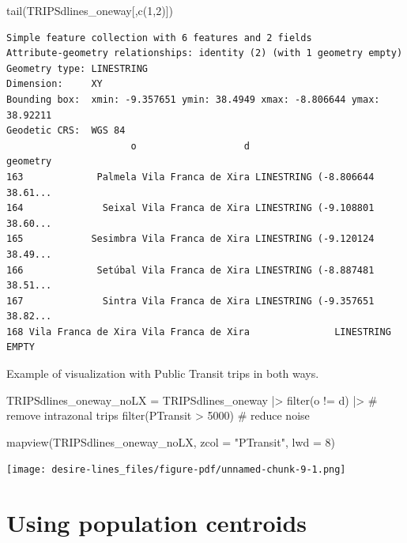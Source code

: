 \documentclass[
  letterpaper,
  DIV=11,
  numbers=noendperiod]{scrreprt}
\newenvironment{Shaded}{\begin{snugshade}}{\end{snugshade}}
\newcommand{\AttributeTok}[1]{\textcolor[rgb]{0.40,0.45,0.13}{#1}}
\newcommand{\CommentTok}[1]{\textcolor[rgb]{0.37,0.37,0.37}{#1}}
\newcommand{\DecValTok}[1]{\textcolor[rgb]{0.68,0.00,0.00}{#1}}
\newcommand{\FunctionTok}[1]{\textcolor[rgb]{0.28,0.35,0.67}{#1}}
\newcommand{\NormalTok}[1]{\textcolor[rgb]{0.00,0.23,0.31}{#1}}
\newcommand{\OtherTok}[1]{\textcolor[rgb]{0.00,0.23,0.31}{#1}}
\newcommand{\SpecialCharTok}[1]{\textcolor[rgb]{0.37,0.37,0.37}{#1}}
\newcommand{\StringTok}[1]{\textcolor[rgb]{0.13,0.47,0.30}{#1}}
\begin{document}
\begin{Shaded}
\begin{Highlighting}[]
\FunctionTok{tail}\NormalTok{(TRIPSdlines\_oneway[,}\FunctionTok{c}\NormalTok{(}\DecValTok{1}\NormalTok{,}\DecValTok{2}\NormalTok{)])}
\end{Highlighting}
\end{Shaded}

\begin{verbatim}
Simple feature collection with 6 features and 2 fields
Attribute-geometry relationships: identity (2) (with 1 geometry empty)
Geometry type: LINESTRING
Dimension:     XY
Bounding box:  xmin: -9.357651 ymin: 38.4949 xmax: -8.806644 ymax: 38.92211
Geodetic CRS:  WGS 84
                      o                   d                       geometry
163             Palmela Vila Franca de Xira LINESTRING (-8.806644 38.61...
164              Seixal Vila Franca de Xira LINESTRING (-9.108801 38.60...
165            Sesimbra Vila Franca de Xira LINESTRING (-9.120124 38.49...
166             Setúbal Vila Franca de Xira LINESTRING (-8.887481 38.51...
167              Sintra Vila Franca de Xira LINESTRING (-9.357651 38.82...
168 Vila Franca de Xira Vila Franca de Xira               LINESTRING EMPTY
\end{verbatim}

Example of visualization with Public Transit trips in both ways.

\begin{Shaded}
\begin{Highlighting}[]
\NormalTok{TRIPSdlines\_oneway\_noLX }\OtherTok{=}\NormalTok{ TRIPSdlines\_oneway }\SpecialCharTok{|\textgreater{}} 
  \FunctionTok{filter}\NormalTok{(o }\SpecialCharTok{!=}\NormalTok{ d) }\SpecialCharTok{|\textgreater{}} \CommentTok{\# remove intrazonal trips}
  \FunctionTok{filter}\NormalTok{(PTransit }\SpecialCharTok{\textgreater{}} \DecValTok{5000}\NormalTok{) }\CommentTok{\# reduce noise}

\FunctionTok{mapview}\NormalTok{(TRIPSdlines\_oneway\_noLX, }\AttributeTok{zcol =} \StringTok{"PTransit"}\NormalTok{, }\AttributeTok{lwd =} \DecValTok{8}\NormalTok{)}
\end{Highlighting}
\end{Shaded}

\texttt{[image: desire-lines\_files/figure-pdf/unnamed-chunk-9-1.png]}

\section{Using population centroids}\label{using-population-centroids}
\end{document}
